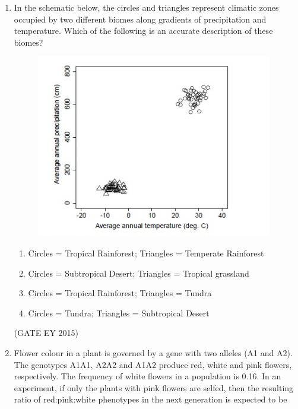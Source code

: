\documentclass[journal,12pt,onecolumn]{IEEEtran}
\theoremstyle{remark}
\begin{document}
\begin{enumerate}
\begin{multicols}{4}
\begin{enumerate}
    \end{enumerate}
    \end{multicols}
\hfill{(GATE EY 2015)}
\item 
In the schematic below, the circles and triangles represent climatic zones occupied by two different biomes along gradients of precipitation and temperature. Which of the following is an accurate description of these biomes?

\begin{figure}[H]
    \centering
    \includegraphics[]{figs/Q.34.png}
    \caption{}
    \label{fig:3}
\end{figure}
\begin{enumerate}
    
\item Circles = Tropical Rainforest; Triangles = Temperate Rainforest
\item Circles = Subtropical Desert; Triangles = Tropical grassland
\item Circles = Tropical Rainforest; Triangles = Tundra
\item Circles = Tundra; Triangles = Subtropical Desert

    \end{enumerate}
    
\hfill{(GATE EY 2015)}

\item 
Flower colour in a plant is governed by a gene with two alleles (A1 and A2). The genotypes A1A1, A2A2 and A1A2 produce red, white and pink flowers, respectively. The frequency of white flowers in a population is 0.16. In an experiment, if only the plants with pink flowers are selfed, then the resulting ratio of red:pink:white phenotypes in the next generation is expected to be


\end{enumerate}
\end{document}
